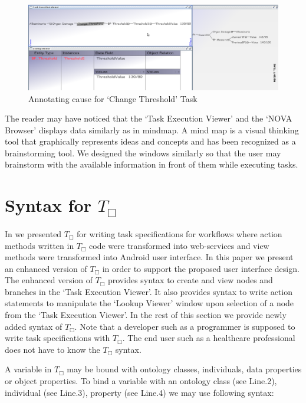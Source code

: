 \documentclass[a4paper]{llncs}
\begin{document}
\begin{figure}
  \begin{center}
    \includegraphics[width=\textwidth]{visit3_new.png}
    \caption{Annotating cause for `Change Threshold' Task }
    \label{fig:followup}
  \end{center}
\end{figure}

The reader may have noticed that the `Task Execution Viewer' and the `NOVA Browser' displays data similarly as in mindmap. 
A mind map is a visual thinking tool that graphically represents ideas and concepts and has been recognized as a brainstorming tool. 
We designed the windows similarly so that the user may brainstorm with the available information in front of them while executing tasks. 


\section{Syntax for $T_{\Box}$}\label{label:language}
In \cite{FazleMacCaull2012MODELS} \cite{RabbiM12} we presented $T_{\Box}$ for writing task specifications for workflows where 
action methods written in $T_\Box$ code were transformed into web-services and view methods were transformed into Android user interface. 
In this paper we present an enhanced version of $T_{\Box}$ in order to support the proposed user interface design. 
The enhanced version of $T_{\Box}$ provides syntax to create and view nodes and branches in the `Task Execution Viewer'.
It also provides syntax to write action statements to manipulate the `Lookup Viewer' window upon selection of a node from the `Task Execution Viewer'. 
In the rest of this section we provide newly added syntax of $T_{\Box}$. Note that a developer such as a programmer is supposed to write task specifications with $T_{\Box}$. 
The end user such as a healthcare professional does not have to know the $T_{\Box}$ syntax. 


A variable in $T_{\Box}$ may be bound with ontology classes, individuals, data properties or object properties. 
To bind a variable with an ontology class (see Line.2), individual (see Line.3), property (see Line.4) we may use following syntax: 
\end{document}
